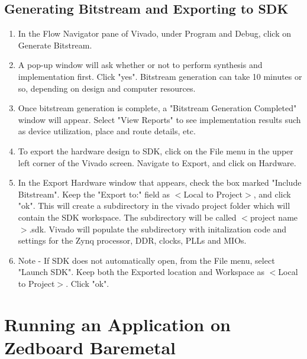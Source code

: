 \documentclass[12pt]{article}
\begin{document}
\subsection{Generating Bitstream and Exporting to SDK}\label{subsec:Exporting to SDK}
\begin{enumerate}

\item In the Flow Navigator pane of Vivado, under Program and Debug, click on Generate Bitstream.
\item A pop-up window will ask whether or not to perform synthesis and implementation first.  Click "yes".  Bitstream generation can take 10 minutes or so, depending on design and computer resources.
\item Once bitstream generation is complete, a "Bitstream Generation Completed" window will appear.  Select "View Reports" to see implementation results such as device utilization, place and route details, etc.
\item To export the hardware design to SDK, click on the File menu in the upper left corner of the Vivado screen.  Navigate to Export, and click on Hardware.
\item In the Export Hardware window that appears, check the box marked "Include Bitstream".  Keep the "Export to:" field as $<$Local to Project$>$, and click "ok".  This will create a subdirectory in the vivado project folder which will contain the SDK workspace.  The subdirectory will be called $<$project name$>$.sdk.  Vivado will populate the subdirectory with initalization code and settings for the Zynq processor, DDR, clocks, PLLs and MIOs.
\item Note - If SDK does not automatically open, from the File menu, select "Launch SDK".  Keep both the Exported location and Workspace as $<$Local to Project$>$.  Click "ok".

\end{enumerate}
\section{Running an Application on Zedboard Baremetal}


\end{document}
